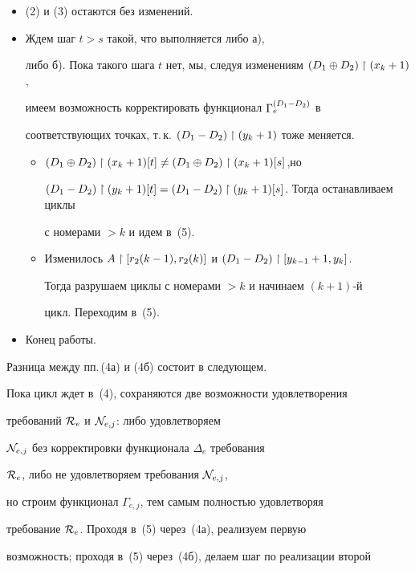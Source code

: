 \begin{itemize}


\item[(1),] (2) и (3) остаются без изменений.


\item[(4)$\phantom{,}$] Ждем шаг $t>s$ такой, что выполняется либо а),


либо б). Пока такого шага $t$ нет, мы, следуя изменениям $(D_1\oplus D_2)\upharpoonright(x_k+1)$,


имеем возможность корректировать функционал $\Gamma_e^{\draz}$ в


соответствующих точках, т.\,к. $\draz\rst(y_k+1)$ тоже меняется.


\begin{itemize}


\item[а)]$(D_1\oplus D_2)\upharpoonright(x_k+1)[t]\neq(D_1\oplus D_2)\upharpoonright(x_k+1)[s]$,но


$\draz\rst(y_k+1)[t]=\draz\rst(y_k+1)[s]$. Тогда останавливаем циклы


с номерами $>k$ и идем в~(5).


\item[б)] Изменилось $A\upharpoonright[r_2(k-1),r_2(k)]$ и $\draz\rst[y_{k-1}+1,y_k]$.


Тогда разрушаем циклы с номерами $>k$ и начинаем $(k+1)$-й


цикл. Переходим в~(5).


\end{itemize}


\item[(5)] Конец работы.


\end{itemize}





Разница между пп.\,(4а) и (4б) состоит в следующем.


Пока цикл ждет в~(4), сохраняются две возможности удовлетворения


требований ${\cal R}_e$ и ${\cal N}_{e,j}$: либо удовлетворяем


${\cal N}_{e,j}$ без корректировки функционала $\Delta_e$ требования


${\cal R}_e$, либо не удовлетворяем требования ${\cal N}_{e,j}$,


но строим функционал $\Gamma_{e,j}$, тем самым полностью удовлетворяя


требование ${\cal R}_e$. Проходя в~(5) через~(4а), реализуем первую


возможность; проходя в~(5) через~(4б), делаем шаг по реализации второй


